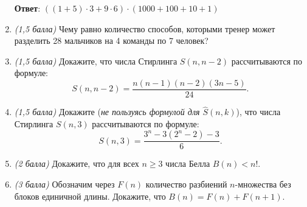 \documentclass{article}
\begin{document}
\begin{enumerate}
    \textbf{Ответ}:
    $((1 + 5) \cdot 3 + 9 \cdot 6) \cdot (1000 + 100 + 10 + 1)$

    
    \item \textit{(1,5 балла)} Чему равно количество способов, которыми тренер может разделить 28 мальчиков на 4 команды по 7 человек?
    
    \item \textit{(1,5 балла)} Докажите, что числа Стирлинга $S(n,n-2)$ рассчитываются по формуле:
    $$S(n,n-2)=\frac{n(n-1)(n-2)(3n-5)}{24}.$$
    
    \item \textit{(1,5 балла)} Докажите (\textit{не пользуясь формулой для $\hat{S}(n,k)$}), что числа Стирлинга $S(n,3)$ рассчитываются по формуле:
    $$S(n,3)=\frac{3^n-3(2^n-2)-3}{6}.$$
    
    \item \textit{(2 балла)} Докажите, что для всех $n\geq3$ числа Белла $B(n)<n!$.
    
    \item \textit{(3 балла)} Обозначим через $F(n)$ количество разбиений $n$-множества без блоков единичной длины. Докажите, что $B(n) = F(n) + F(n+1)$.
    
    \end{enumerate}
\end{document}
